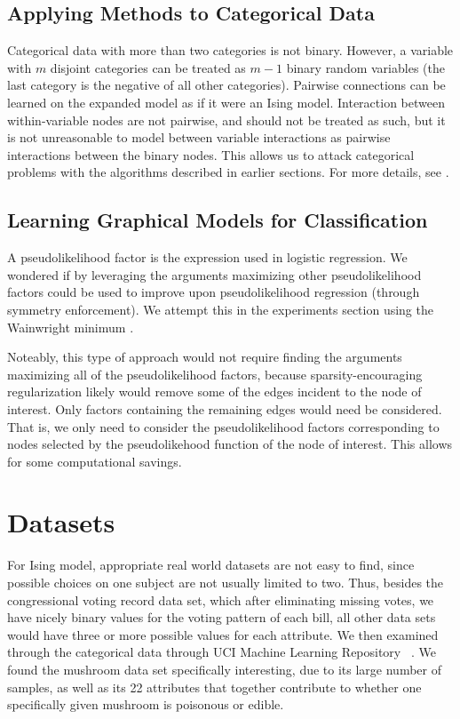 \documentclass[11pt]{article}
\begin{document}
\subsection{Applying Methods to Categorical Data}
Categorical data with more than two categories is not binary.
However, a variable with $m$ disjoint categories can be treated as $m - 1$ binary random variables (the last category is the negative of all other categories).
Pairwise connections can be learned on the expanded model as if it were an Ising model.
Interaction between within-variable nodes are not pairwise, and should not be treated as such, but it is not unreasonable to model between variable interactions as pairwise interactions between the binary nodes.
This allows us to attack categorical problems with the algorithms described in earlier sections.
For more details, see \cite{ravikumar2010high}.  


\subsection{Learning Graphical Models for Classification}
A pseudolikelihood factor is the expression used in logistic regression. We wondered if by leveraging the arguments maximizing other pseudolikelihood factors could be used to improve upon pseudolikelihood regression (through symmetry enforcement). We attempt this in the experiments section using the Wainwright minimum \cite{hoffling2009estimation}. 

Noteably, this type of approach would not require finding the arguments maximizing all of the pseudolikelihood factors, because sparsity-encouraging regularization likely would remove some of the edges incident to the node of interest. Only factors containing the remaining edges would need be considered. That is, we only need to consider the pseudolikelihood factors corresponding to nodes selected by the pseudolikehood function of the node of interest. This allows for some computational savings.

\section{Datasets}

For Ising model, appropriate real world datasets are not easy to find, since possible choices on one subject are not usually limited to two. Thus, besides the congressional voting record data set, which after eliminating missing votes, we have nicely binary values for the voting pattern of each bill, all other data sets would have three or more possible values for each attribute. We then examined through the categorical data through UCI Machine Learning Repository ~\cite{Dua:2017}. We found the mushroom data set specifically interesting, due to its large number of samples, as well as its 22 attributes that together contribute to whether one specifically given mushroom is poisonous or edible.
\end{document}
